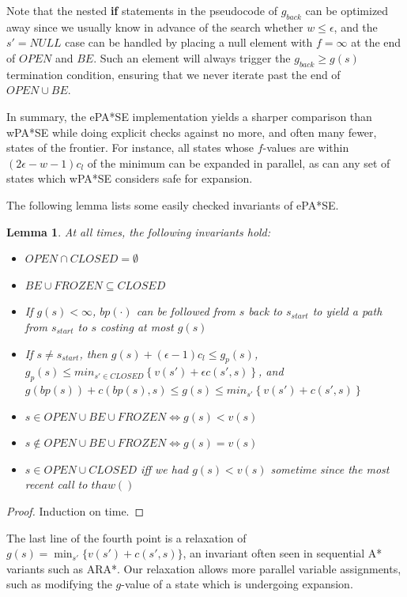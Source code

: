 \documentclass[letterpaper]{article}
\newtheorem{lemma}{Lemma}
\begin{document}
Note that the nested \textbf{if} statements in the pseudocode of $g_{back}$ can be optimized away since we usually know in advance of the search whether $w \le \epsilon$, and the $s' = NULL$ case can be handled by placing a null element with $f = \infty$ at the end of $OPEN$ and $BE$. Such an element will always trigger the $g_{back} \ge g(s)$ termination condition, ensuring that we never iterate past the end of $OPEN\cup BE$.

In summary, the ePA*SE implementation yields a sharper comparison than wPA*SE while doing explicit checks against no more, and often many fewer, states of the frontier. For instance, all states whose $f$-values are within $(2\epsilon-w-1)c_l$ of the minimum can be expanded in parallel, as can any set of states which wPA*SE considers safe for expansion.

The following lemma lists some easily checked invariants of ePA*SE.

\begin{lemma}
\label{lem:prop}
At all times, the following invariants hold:
\begin{itemize}
\item $OPEN\cap CLOSED = \emptyset$
\item $BE\cup FROZEN \subseteq CLOSED$
\item If $g(s)<\infty$, $bp(\cdot)$ can be followed from $s$ back to $s_{start}$ to yield a path from $s_{start}$ to $s$ costing at most $g(s)$
\item If $s\ne s_{start}$, then $g(s) + (\epsilon-1)c_l \le g_p(s)$,
\\$g_p(s) \le min_{s'\in CLOSED}\left\{v(s') + \epsilon c(s',s)\right\}$, and
\\$g(bp(s)) + c(bp(s),s) \le g(s) \le min_{s'}\left\{v(s') + c(s',s)\right\}$
\item $s\in OPEN\cup BE\cup FROZEN \Leftrightarrow g(s) < v(s)$
\item $s\notin OPEN\cup BE\cup FROZEN \Leftrightarrow g(s) = v(s)$
\item $s\in OPEN\cup CLOSED$ iff we had $g(s)<v(s)$ sometime since the most recent call to $thaw()$
\end{itemize}
\end{lemma}

\begin{proof}
Induction on time.
\end{proof}

The last line of the fourth point is a relaxation of $g(s) = \min_{s'}\{v(s') + c(s',s)\}$, an invariant often seen in sequential A* variants such as ARA*. Our relaxation allows more parallel variable assignments, such as modifying the $g$-value of a state which is undergoing expansion.
\end{document}
